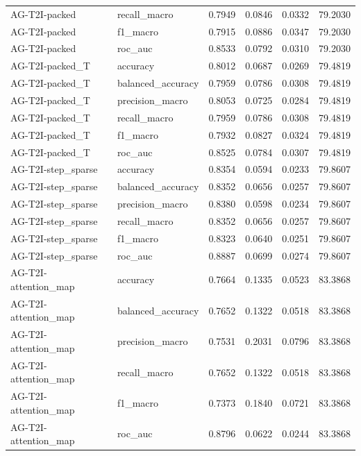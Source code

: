 \begin{tabular}{llrrrr}
AG-T2I-packed & recall_macro & 0.7949 & 0.0846 & 0.0332 & 79.2030 \\
AG-T2I-packed & f1_macro & 0.7915 & 0.0886 & 0.0347 & 79.2030 \\
AG-T2I-packed & roc_auc & 0.8533 & 0.0792 & 0.0310 & 79.2030 \\
AG-T2I-packed_T & accuracy & 0.8012 & 0.0687 & 0.0269 & 79.4819 \\
AG-T2I-packed_T & balanced_accuracy & 0.7959 & 0.0786 & 0.0308 & 79.4819 \\
AG-T2I-packed_T & precision_macro & 0.8053 & 0.0725 & 0.0284 & 79.4819 \\
AG-T2I-packed_T & recall_macro & 0.7959 & 0.0786 & 0.0308 & 79.4819 \\
AG-T2I-packed_T & f1_macro & 0.7932 & 0.0827 & 0.0324 & 79.4819 \\
AG-T2I-packed_T & roc_auc & 0.8525 & 0.0784 & 0.0307 & 79.4819 \\
AG-T2I-step_sparse & accuracy & 0.8354 & 0.0594 & 0.0233 & 79.8607 \\
AG-T2I-step_sparse & balanced_accuracy & 0.8352 & 0.0656 & 0.0257 & 79.8607 \\
AG-T2I-step_sparse & precision_macro & 0.8380 & 0.0598 & 0.0234 & 79.8607 \\
AG-T2I-step_sparse & recall_macro & 0.8352 & 0.0656 & 0.0257 & 79.8607 \\
AG-T2I-step_sparse & f1_macro & 0.8323 & 0.0640 & 0.0251 & 79.8607 \\
AG-T2I-step_sparse & roc_auc & 0.8887 & 0.0699 & 0.0274 & 79.8607 \\
AG-T2I-attention_map & accuracy & 0.7664 & 0.1335 & 0.0523 & 83.3868 \\
AG-T2I-attention_map & balanced_accuracy & 0.7652 & 0.1322 & 0.0518 & 83.3868 \\
AG-T2I-attention_map & precision_macro & 0.7531 & 0.2031 & 0.0796 & 83.3868 \\
AG-T2I-attention_map & recall_macro & 0.7652 & 0.1322 & 0.0518 & 83.3868 \\
AG-T2I-attention_map & f1_macro & 0.7373 & 0.1840 & 0.0721 & 83.3868 \\
AG-T2I-attention_map & roc_auc & 0.8796 & 0.0622 & 0.0244 & 83.3868 \\
\bottomrule
\end{tabular}
